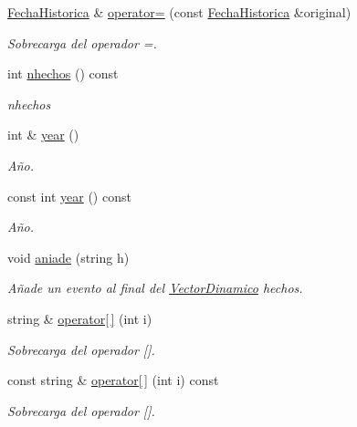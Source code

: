 \begin{DoxyCompactItemize}
\hyperlink{classFechaHistorica}{Fecha\+Historica} \& \hyperlink{classFechaHistorica_a0b00388fbd4b9bdd3ee879c00f48c25e}{operator=} (const \hyperlink{classFechaHistorica}{Fecha\+Historica} \&original)
\begin{DoxyCompactList}\small\item\em Sobrecarga del operador =. \end{DoxyCompactList}\item 
int \hyperlink{classFechaHistorica_a90873197cc7549c5262b6dc793fc924b}{nhechos} () const
\begin{DoxyCompactList}\small\item\em nhechos \end{DoxyCompactList}\item 
int \& \hyperlink{classFechaHistorica_a3ef5b14533374b8c8afc7d3d9c665f40}{year} ()
\begin{DoxyCompactList}\small\item\em Año. \end{DoxyCompactList}\item 
const int \hyperlink{classFechaHistorica_a3c9a08e7f7bf07892960d4e69e10b429}{year} () const
\begin{DoxyCompactList}\small\item\em Año. \end{DoxyCompactList}\item 
void \hyperlink{classFechaHistorica_a26dcd8284405e97a513c258c352ecc0e}{aniade} (string h)
\begin{DoxyCompactList}\small\item\em Añade un evento al final del {\ttfamily \hyperlink{classVectorDinamico}{Vector\+Dinamico}} hechos. \end{DoxyCompactList}\item 
string \& \hyperlink{classFechaHistorica_a3b8e8dff270c27f1d5b3b2377dc6535f}{operator\mbox{[}$\,$\mbox{]}} (int i)
\begin{DoxyCompactList}\small\item\em Sobrecarga del operador \mbox{[}\mbox{]}. \end{DoxyCompactList}\item 
const string \& \hyperlink{classFechaHistorica_a645b7c79fa2d717cf22b37db230c7ce1}{operator\mbox{[}$\,$\mbox{]}} (int i) const
\begin{DoxyCompactList}\small\item\em Sobrecarga del operador \mbox{[}\mbox{]}. \end{DoxyCompactList}\item 

\end{DoxyCompactItemize}
